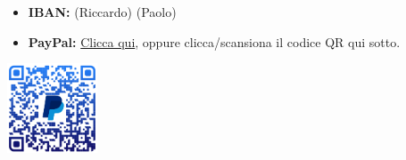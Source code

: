 \section*{}
\begin{itemize}[left=0pt, itemindent=-4em, labelsep=1em]
  \item \textbf{IBAN:}\newline
  \href{\Riccardolink}{\ibanRic} (Riccardo)\newline
  \href{\Paololink}{\ibanPao} (Paolo)
  \\
  \item \textbf{PayPal:}\newline
  \href{\PayPallink}{Clicca qui},
  oppure clicca/scansiona il codice QR qui sotto.
\end{itemize}
\vspace{2.5mm}
\begin{center}
  \href{\PayPallink}{
    \includegraphics[width=0.2\textwidth]{../PayPal.png}
  }
\end{center}